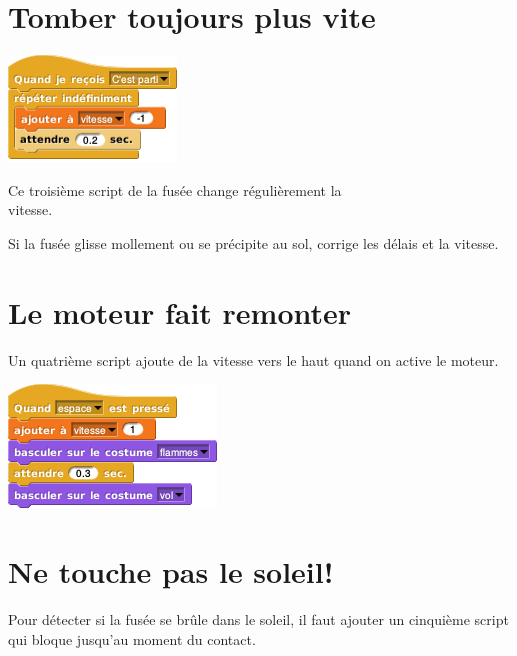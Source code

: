 \documentclass[a7paper,pagesize,DIV=14,10pt]{scrbook}
\begin{document}
\section*{Tomber toujours plus vite}
\vspace{-.8\baselineskip}

\begin{minipage}{.5\linewidth}
  \includegraphics[scale=.5]{img/fusee_tomber-plus-vite.png}
\end{minipage}
\begin{minipage}{.5\linewidth}
  Ce troisième script de la fusée change régulièrement la\\ vitesse.
\end{minipage}

Si la fusée glisse mollement ou se précipite au sol, corrige les délais et la
vitesse.

\newpage
\section*{Le moteur fait remonter}
\vspace{-.7\baselineskip}

Un quatrième script ajoute de la vitesse vers le haut quand on active le moteur.

\includegraphics[scale=.5]{img/fusee_moteur.png}

\section*{Ne touche pas le soleil!}
\vspace{-.7\baselineskip} %
Pour détecter si la fusée se brûle dans le soleil, il faut ajouter un cinquième
script qui bloque jusqu'au moment du contact.
\end{document}
